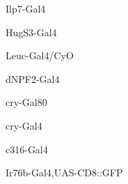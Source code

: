 \documentclass[17pt]{extarticle}
\begin{document}
\footnotesize
\vspace*{\fill}
\newpage{}
\vspace*{\fill}\begin{large}
Ilp7-Gal4 \\[0.5em]
\end{large}
\footnotesize
\vspace*{\fill}
\newpage{}
\vspace*{\fill}\begin{large}
HugS3-Gal4 \\[0.5em]
\end{large}
\footnotesize
\vspace*{\fill}
\newpage{}
\vspace*{\fill}\begin{normalsize}
Leuc-Gal4/CyO \\[0.5em]
\end{normalsize}
\footnotesize
\vspace*{\fill}
\newpage{}
\vspace*{\fill}\begin{large}
dNPF2-Gal4 \\[0.5em]
\end{large}
\footnotesize
\vspace*{\fill}
\newpage{}
\vspace*{\fill}\begin{large}
cry-Gal80 \\[0.5em]
\end{large}
\footnotesize
\vspace*{\fill}
\newpage{}
\vspace*{\fill}\begin{large}
cry-Gal4 \\[0.5em]
\end{large}
\footnotesize
\vspace*{\fill}
\newpage{}
\vspace*{\fill}\begin{large}
c316-Gal4 \\[0.5em]
\end{large}
\footnotesize
\vspace*{\fill}
\newpage{}
\vspace*{\fill}\begin{footnotesize}
Ir76b-Gal4,UAS-CD8::GFP \\[0.5em]
\end{footnotesize}
\footnotesize
\vspace*{\fill}
\end{document}
